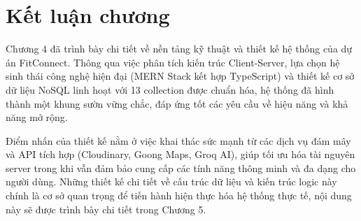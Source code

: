 \section{Kết luận chương}
\label{sec:tech_conclusion}

Chương 4 đã trình bày chi tiết về nền tảng kỹ thuật và thiết kế hệ thống của dự án FitConnect. Thông qua việc phân tích kiến trúc Client-Server, lựa chọn hệ sinh thái công nghệ hiện đại (MERN Stack kết hợp TypeScript) và thiết kế cơ sở dữ liệu NoSQL linh hoạt với 13 collection được chuẩn hóa, hệ thống đã hình thành một khung sườn vững chắc, đáp ứng tốt các yêu cầu về hiệu năng và khả năng mở rộng. 

Điểm nhấn của thiết kế nằm ở việc khai thác sức mạnh từ các dịch vụ đám mây và API tích hợp (Cloudinary, Goong Maps, Groq AI), giúp tối ưu hóa tài nguyên server trong khi vẫn đảm bảo cung cấp các tính năng thông minh và đa dạng cho người dùng. Những thiết kế chi tiết về cấu trúc dữ liệu và kiến trúc logic này chính là cơ sở quan trọng để tiến hành hiện thực hóa hệ thống thực tế, nội dung này sẽ được trình bày chi tiết trong Chương 5.
